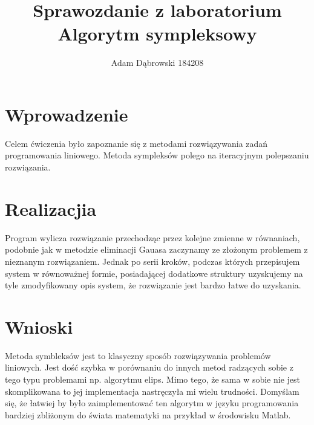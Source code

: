 \documentclass[a4paper,11pt]{report}
\title{\textbf{Sprawozdanie z laboratorium\\Algorytm sympleksowy}}
\author{Adam Dąbrowski 184208}
\begin{document}
\maketitle
\chapter{Wprowadzenie}

Celem ćwiczenia było zapoznanie się z metodami rozwiązywania zadań programowania liniowego. Metoda sympleksów polego na iteracyjnym  polepszaniu rozwiązania.

\chapter{Realizacjia}

Program wylicza rozwiązanie przechodząc przez kolejne zmienne w równaniach, podobnie jak w metodzie eliminacji Gauasa zaczynamy ze złożonym problemem z nieznanym rozwiązaniem. Jednak po serii kroków, podczas których przepisujem system w równoważnej formie, posiadającej dodatkowe struktury uzyskujemy na tyle zmodyfikowany opis system, że rozwiązanie jest bardzo łatwe do uzyskania.


\chapter{Wnioski}
Metoda symbleksów jest to klasyczny sposób rozwiązywania problemów liniowych. Jest dość szybka w porównaniu do innych metod radzących sobie z tego typu problemami np. algorytmu elips. Mimo tego, że sama w sobie nie jest skomplikowana to jej implementacja nastręczyła mi wielu trudności. Domyślam się, że łatwiej by było zaimplementować ten algorytm w języku programowania bardziej zbliżonym do świata matematyki na przykład w środowisku Matlab.
\end{document}
